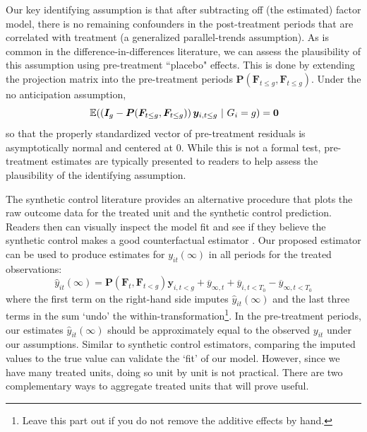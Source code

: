 \documentclass[12pt]{article}
\begin{document}
\begin{remark}\label{remark:assessing_assumptions}

Our key identifying assumption is that after subtracting off (the estimated) factor model, there is no remaining confounders in the post-treatment periods that are correlated with treatment (a generalized parallel-trends assumption). As is common in the difference-in-differences literature, we can assess the plausibility of this assumption using pre-treatment ``placebo" effects. This is done by extending the projection matrix into the pre-treatment periods $\bm P(\bm{F}_{t \leq g}, \bm{F}_{t \leq g})$. Under the no anticipation assumption, 
\begin{equation}
  \expec{ \left( \bm I_{g} - \bm P(\bm{F}_{t \leq g}, \bm{F}_{t \leq g}) \right) \bm y_{i, t \leq g}}{G_i = g} = \bm 0
\end{equation}
so that the properly standardized vector of pre-treatment residuals is asymptotically normal and centered at 0. While this is not a formal test, pre-treatment estimates are typically presented to readers to help assess the plausibility of the identifying assumption.

The synthetic control literature provides an alternative procedure that plots the raw outcome data for the treated unit and the synthetic control prediction. Readers then can visually inspect the model fit and see if they believe the synthetic control makes a good counterfactual estimator \citep{abadie2021using}. Our proposed estimator can be used to produce estimates for $y_{it}(\infty)$ in all periods for the treated observations:
\begin{equation}
  \hat{y}_{it}(\infty) = \bm P(\bm{F}_t, \bm{F}_{t < g}) \bm y_{i, t<g} + \overline{y}_{\infty, t} + \overline{y}_{i, t<T_0} - \overline{y}_{\infty, t<T_0}
\end{equation}
where the first term on the right-hand side imputes $\hat{y}_{it}(\infty)$ and the last three terms in the sum `undo' the within-transformation\footnote{Leave this part out if you do not remove the additive effects by hand.}. In the pre-treatment periods, our estimates $\hat{y}_{it}(\infty)$ should be approximately equal to the observed $y_{it}$ under our assumptions. Similar to synthetic control estimators, comparing the imputed values to the true value can validate the `fit' of our model. However, since we have many treated units, doing so unit by unit is not practical. There are two complementary ways to aggregate treated units that will prove useful. 


\end{remark}
\end{document}
